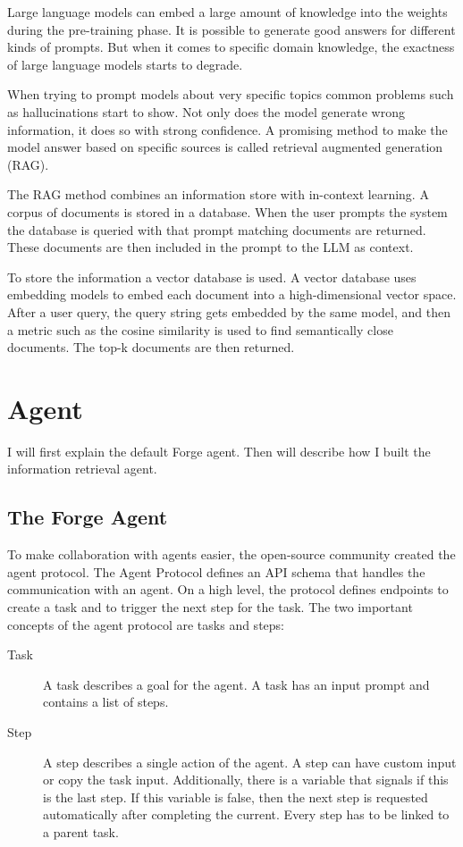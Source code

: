 \documentclass[../main.tex]{subfiles}
\begin{document}
Large language models can embed a large amount of knowledge into the weights during the pre-training phase.
It is possible to generate good answers for different kinds of prompts.
But when it comes to specific domain knowledge, the exactness of large language models starts to degrade.

When trying to prompt models about very specific topics common problems such as hallucinations start to show.
Not only does the model generate wrong information, it does so with strong confidence.
A promising method to make the model answer based on specific sources is called retrieval augmented generation (RAG).

The RAG method combines an information store with in-context learning.
A corpus of documents is stored in a database.
When the user prompts the system the database is queried with that prompt matching documents are returned.
These documents are then included in the prompt to the LLM as context.

To store the information a vector database is used.
A vector database uses embedding models to embed each document into a high-dimensional vector space.
After a user query, the query string gets embedded by the same model,
and then a metric such as the cosine similarity is used to find semantically close documents.
The top-k documents are then returned.

\section{Agent}

I will first explain the default Forge agent.
Then will describe how I built the information retrieval agent.

\subsection{The Forge Agent}

To make collaboration with agents easier, the open-source community created the agent protocol.
The Agent Protocol defines an API schema that handles the communication with an agent.
On a high level, the protocol defines endpoints to create a task and to trigger the next step for the task.
The two important concepts of the agent protocol are tasks and steps:

\begin{description}
    \item[Task] A task describes a goal for the agent.
        A task has an input prompt and contains a list of steps.
    \item[Step] A step describes a single action of the agent.
        A step can have custom input or copy the task input.
        Additionally, there is a variable that signals if this is the last step.
        If this variable is false, then the next step is requested automatically after completing the current.
        Every step has to be linked to a parent task.
\end{description}
\end{document}

